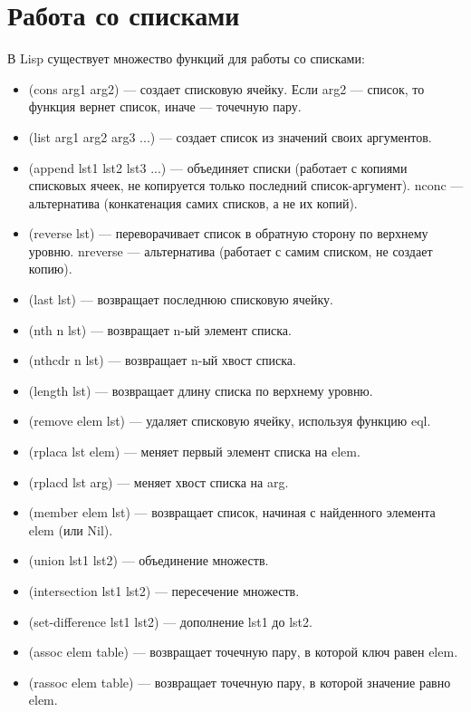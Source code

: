 \documentclass[12pt]{report}
\begin{document}
\section{Работа со списками}

В Lisp существует множество функций для работы со списками:

\begin{itemize}
    \item (cons arg1 arg2) --- создает списковую ячейку. Если arg2 --- список, то функция вернет список, иначе --- точечную пару.
    \item (list arg1 arg2 arg3 ...) --- создает список из значений своих аргументов.
    \item (append lst1 lst2 lst3 ...) --- объединяет списки (работает с копиями
списковых ячеек, не копируется только последний список-аргумент). nconc ---альтернатива (конкатенация самих списков, а не их копий).
    \item (reverse lst) --- переворачивает список в обратную сторону по верхнему уровню. nreverse --- альтернатива (работает с самим списком, не создает копию).
    \item (last lst) --- возвращает последнюю списковую ячейку.
    \item (nth n lst) --- возвращает n-ый элемент списка.
    \item (nthcdr n lst) --- возвращает n-ый хвост списка.
    \item (length lst) --- возвращает длину списка по верхнему уровню.
    \item (remove elem lst) --- удаляет списковую ячейку, используя функцию
eql.
    \item (rplaca lst elem) --- меняет первый элемент списка на elem.
    \item (rplacd lst arg) --- меняет хвост списка на arg.
    \item (member elem lst) --- возвращает список, начиная с найденного элемента
elem (или Nil).
    \item (union lst1 lst2) --- объединение множеств.
    \item (intersection lst1 lst2) --- пересечение множеств.
    \item (set-difference lst1 lst2) --- дополнение lst1 до lst2.
    \item (assoc elem table) --- возвращает точечную пару, в которой ключ равен
elem.
    \item (rassoc elem table) --- возвращает точечную пару, в которой значение
равно elem.
\end{itemize}
\end{document}
